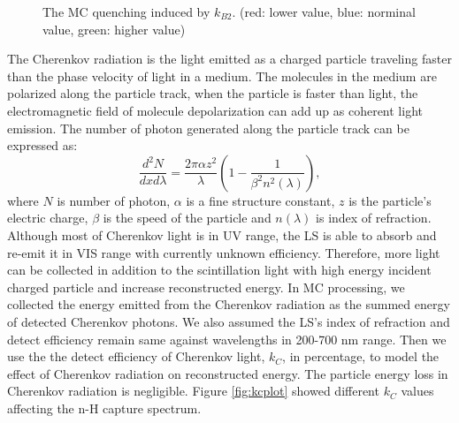 \begin{figure}[h!]
\centering
{}\quad
{}
\caption{The MC quenching induced by $k_{B2}$. (red: lower value, blue: norminal value, green: higher value)}
\label{fig:kb2plot}
\end{figure}

The Cherenkov radiation is the light emitted as a charged particle traveling faster than the phase velocity of light in a medium. 
The molecules in the medium are polarized along the particle track, when the particle is faster than light, the electromagnetic field of molecule depolarization can add up as coherent light emission. 
The number of photon generated along the particle track can be expressed as:
\begin{equation}
    \frac{d^2N}{dxd\lambda} = \frac{2\pi\alpha z^2}{\lambda}\left(1- \frac{1}{\beta^2n^2(\lambda)}\right),
\end{equation}
where $N$ is number of photon, $\alpha$ is a fine structure constant, $z$ is the particle's electric charge, $\beta$ is the speed of the particle and $n(\lambda)$ is index of refraction.
Although most of Cherenkov light is in UV range, the LS is able to absorb and re-emit it in VIS range with currently unknown efficiency.
Therefore, more light can be collected in addition to the scintillation light with high energy incident charged particle and increase reconstructed energy.
In MC processing, we collected the energy emitted from the Cherenkov radiation as the summed energy of detected Cherenkov photons. 
We also assumed the LS's index of refraction and detect efficiency remain same against wavelengths in 200-700 nm range.
Then we use the the detect efficiency of Cherenkov light, $k_{C}$, in percentage, to model the effect of Cherenkov radiation on reconstructed energy. 
The particle energy loss in Cherenkov radiation is negligible.
Figure \ref{fig:kcplot} showed different $k_{C}$ values affecting the n-H capture spectrum.

